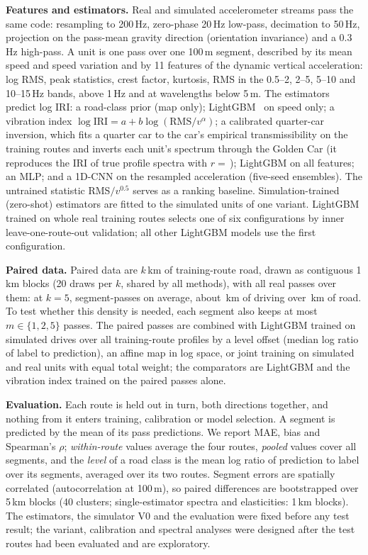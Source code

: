 \textbf{Features and estimators.}
Real and simulated accelerometer streams pass the same code: resampling to 200\,Hz, zero-phase 20\,Hz low-pass, decimation to 50\,Hz, projection on the pass-mean gravity direction (orientation invariance) and a 0.3\,Hz high-pass.
A unit is one pass over one 100\,m segment, described by its mean speed and speed variation and by 11 features of the dynamic vertical acceleration: log RMS, peak statistics, crest factor, kurtosis, RMS in the 0.5--2, 2--5, 5--10 and 10--15\,Hz bands, above 1\,Hz and at wavelengths below 5\,m.
The estimators predict log IRI: a road-class prior (map only); LightGBM~\cite{ke2017lightgbm} on speed only; a vibration index $\log\mathrm{IRI}=a+b\log(\mathrm{RMS}/v^{\alpha})$; a calibrated quarter-car inversion, which fits a quarter car to the car's empirical transmissibility on the training routes and inverts each unit's spectrum through the Golden Car (it reproduces the IRI of true profile spectra with $r=$\,\invCheckR); LightGBM on all features; an MLP; and a 1D-CNN on the resampled acceleration (five-seed ensembles).
The untrained statistic RMS$/v^{0.5}$ serves as a ranking baseline.
Simulation-trained (zero-shot) estimators are fitted to the simulated units of one variant.
LightGBM trained on whole real training routes selects one of six configurations by inner leave-one-route-out validation; all other LightGBM models use the first configuration.

\textbf{Paired data.}
Paired data are $k$\,km of training-route road, drawn as contiguous 1\,km blocks (20 draws per $k$, shared by all methods), with all real passes over them: at $k=5$, \kdUnitsFive{} segment-passes on average, about \kdDriveKmFive\,km of driving over \kdKmFive\,km of road.
To test whether this density is needed, each segment also keeps at most $m\in\{1,2,5\}$ passes.
The paired passes are combined with LightGBM trained on simulated drives over all training-route profiles by a level offset (median log ratio of label to prediction), an affine map in log space, or joint training on simulated and real units with equal total weight; the comparators are LightGBM and the vibration index trained on the paired passes alone.

\textbf{Evaluation.}
Each route is held out in turn, both directions together, and nothing from it enters training, calibration or model selection.
A segment is predicted by the mean of its pass predictions.
We report MAE, bias and Spearman's $\rho$; \emph{within-route} values average the four routes, \emph{pooled} values cover all \liraSegments{} segments, and the \emph{level} of a road class is the mean log ratio of prediction to label over its segments, averaged over its two routes.
Segment errors are spatially correlated (autocorrelation \acfGbmHundred{} at 100\,m), so paired differences are bootstrapped over 5\,km blocks (40 clusters; single-estimator spectra and elasticities: 1\,km blocks).
The estimators, the simulator V0 and the evaluation were fixed before any test result; the variant, calibration and spectral analyses were designed after the test routes had been evaluated and are exploratory.
